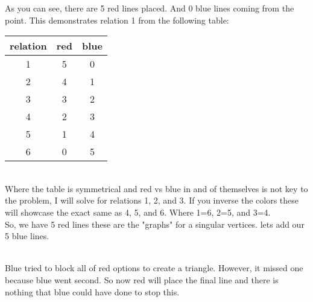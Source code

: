 \documentclass[10pt, AMS Euler]{article}
\begin{document}
\begin{enumerate}
As you can see, there are 5 red lines placed. And 0 blue lines coming from the point. This demonstrates relation 1 from the following table:
\begin{tabular}{|c||c|c|}
              \hline
               relation& red &blue\\
              \hline
               1& 5&0\\
              \hline
               2& 4&1\\
              \hline
  3& 3&2\\\hline
  4& 2&3\\\hline
 5& 1&4\\\hline
 6& 0&5\\\hline
            \end{tabular}
\\ Where the table is symmetrical and red vs blue in and of themselves is not key to the problem, I will solve for relations 1, 2, and 3. If you inverse the colors these will showcase the exact same as 4, 5, and 6. Where 1=6, 2=5, and 3=4. \\ So, we have 5 red lines these are the "graphs" for a singular vertices. lets add our 5 blue lines. 
\begin{center}
            \\
Blue tried to block all of red options to create a triangle. However, it missed one because blue went second. So now red will place the final line and there is nothing that blue could have done to stop this. 
\end{center}


\end{enumerate}
\end{document}
